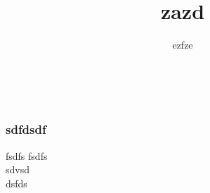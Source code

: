 \documentclass[12pt,a4paper,twoside]{beamer}
\begin{document}
\author{ezfze}\\
\title{zazd}
\maketitle
\begin{frame}
\frametitle{sdfdsdf}
\begin{block}{fsdfs}
fsdfs\\
sdvsd\\
dsfds\\
\end{block}
\end{frame}
\end{document}
